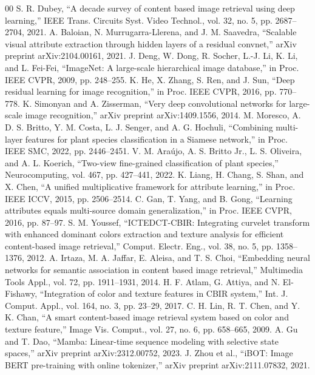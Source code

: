 \documentclass[conference]{IEEEtran}
\begin{document}
\begin{thebibliography}{00}
 S. R. Dubey, ``A decade survey of content based image retrieval using deep learning,'' IEEE Trans. Circuits Syst. Video Technol., vol. 32, no. 5, pp. 2687--2704, 2021.
 A. Baloian, N. Murrugarra-Llerena, and J. M. Saavedra, ``Scalable visual attribute extraction through hidden layers of a residual convnet,'' arXiv preprint arXiv:2104.00161, 2021.
 J. Deng, W. Dong, R. Socher, L.-J. Li, K. Li, and L. Fei-Fei, ``ImageNet: A large-scale hierarchical image database,'' in Proc. IEEE CVPR, 2009, pp. 248--255.
 K. He, X. Zhang, S. Ren, and J. Sun, ``Deep residual learning for image recognition,'' in Proc. IEEE CVPR, 2016, pp. 770--778.
 K. Simonyan and A. Zisserman, ``Very deep convolutional networks for large-scale image recognition,'' arXiv preprint arXiv:1409.1556, 2014.
 M. Moresco, A. D. S. Britto, Y. M. Costa, L. J. Senger, and A. G. Hochuli, ``Combining multi-layer features for plant species classification in a Siamese network,'' in Proc. IEEE SMC, 2022, pp. 2446--2451.
 V. M. Ara\'{u}jo, A. S. Britto Jr., L. S. Oliveira, and A. L. Koerich, ``Two-view fine-grained classification of plant species,'' Neurocomputing, vol. 467, pp. 427--441, 2022.
 K. Liang, H. Chang, S. Shan, and X. Chen, ``A unified multiplicative framework for attribute learning,'' in Proc. IEEE ICCV, 2015, pp. 2506--2514.
 C. Gan, T. Yang, and B. Gong, ``Learning attributes equals multi-source domain generalization,'' in Proc. IEEE CVPR, 2016, pp. 87--97.
 S. M. Youssef, ``ICTEDCT-CBIR: Integrating curvelet transform with enhanced dominant colors extraction and texture analysis for efficient content-based image retrieval,'' Comput. Electr. Eng., vol. 38, no. 5, pp. 1358--1376, 2012.
 A. Irtaza, M. A. Jaffar, E. Aleisa, and T. S. Choi, ``Embedding neural networks for semantic association in content based image retrieval,'' Multimedia Tools Appl., vol. 72, pp. 1911--1931, 2014.
 H. F. Atlam, G. Attiya, and N. El-Fishawy, ``Integration of color and texture features in CBIR system,'' Int. J. Comput. Appl., vol. 164, no. 3, pp. 23--29, 2017.
 C. H. Lin, R. T. Chen, and Y. K. Chan, ``A smart content-based image retrieval system based on color and texture feature,'' Image Vis. Comput., vol. 27, no. 6, pp. 658--665, 2009.
 A. Gu and T. Dao, ``Mamba: Linear-time sequence modeling with selective state spaces,'' arXiv preprint arXiv:2312.00752, 2023.
 J. Zhou et al., ``iBOT: Image BERT pre-training with online tokenizer,'' arXiv preprint arXiv:2111.07832, 2021.

\end{thebibliography}
\end{document}
